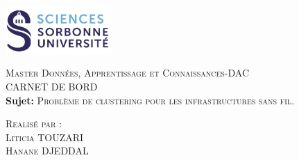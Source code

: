 \documentclass{article}
\begin{document}
\begin{titlepage}
    \begin{flushleft}
    \includegraphics[width=11em]{logo.png}\\[1.5cm]
    \end{flushleft}
    \begin{center}
        \textsc{{\LARGE \color{blue} Master Données, Apprentissage et Connaissances-DAC}}\\[5cm]
        \textsc{\Huge{CARNET DE BORD}}\\[1cm]
        \textbf{\Large{Sujet:}}
        \textsc{\large{Problème de clustering pour les infrastructures sans fil.}}\\[6cm]
        \begin{minipage}{1\textwidth}
            \begin{flushleft} \large
            \textsc{\LARGE{Realisé par :}}\\[0.5cm]
            \textsc{Liticia TOUZARI}\\
            \textsc{Hanane DJEDDAL}\\[1.5 cm]
            \end{flushleft}
        \end{minipage}
        \vfill
    \end{center}
  \end{titlepage}
  

\tableofcontents%


\newpage
\end{document}

